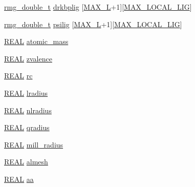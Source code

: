 \begin{DoxyCompactItemize}
\item 
\hyperlink{rmgtypes_8h_aaa16921c14f121c56eaa42390a340db8}{rmg\-\_\-double\-\_\-t} \hyperlink{struct_s_p_e_c_i_e_s_a5f5747982505f49983d15c0db1ab6c96}{drkbplig} \mbox{[}\hyperlink{_t_d_d_f_t_2_headers_2params_8h_adf2a0717e3307419a9d7c52707f5631e}{M\-A\-X\-\_\-\-L}+1\mbox{]}\mbox{[}\hyperlink{_t_d_d_f_t_2_headers_2params_8h_aa0d2d7cede5d9d8023a3dcb8861a3511}{M\-A\-X\-\_\-\-L\-O\-C\-A\-L\-\_\-\-L\-I\-G}\mbox{]}
\item 
\hyperlink{rmgtypes_8h_aaa16921c14f121c56eaa42390a340db8}{rmg\-\_\-double\-\_\-t} \hyperlink{struct_s_p_e_c_i_e_s_ae333127abacaf7428cb238baf6833563}{psilig} \mbox{[}\hyperlink{_t_d_d_f_t_2_headers_2params_8h_adf2a0717e3307419a9d7c52707f5631e}{M\-A\-X\-\_\-\-L}+1\mbox{]}\mbox{[}\hyperlink{_t_d_d_f_t_2_headers_2params_8h_aa0d2d7cede5d9d8023a3dcb8861a3511}{M\-A\-X\-\_\-\-L\-O\-C\-A\-L\-\_\-\-L\-I\-G}\mbox{]}
\item 
\hyperlink{md_8h_a4b654506f18b8bfd61ad2a29a7e38c25}{R\-E\-A\-L} \hyperlink{struct_s_p_e_c_i_e_s_a07aec77bc14fbe814244d1023992e517}{atomic\-\_\-mass}
\item 
\hyperlink{md_8h_a4b654506f18b8bfd61ad2a29a7e38c25}{R\-E\-A\-L} \hyperlink{struct_s_p_e_c_i_e_s_a2596f8ed233b9e49864f86ef944f107a}{zvalence}
\item 
\hyperlink{md_8h_a4b654506f18b8bfd61ad2a29a7e38c25}{R\-E\-A\-L} \hyperlink{struct_s_p_e_c_i_e_s_a9c42a064dc0dca3299b0f565d31a7354}{rc}
\item 
\hyperlink{md_8h_a4b654506f18b8bfd61ad2a29a7e38c25}{R\-E\-A\-L} \hyperlink{struct_s_p_e_c_i_e_s_a707adddcfc9358f43287628469ed9f18}{lradius}
\item 
\hyperlink{md_8h_a4b654506f18b8bfd61ad2a29a7e38c25}{R\-E\-A\-L} \hyperlink{struct_s_p_e_c_i_e_s_a805adc76eb310c6ee4aecbda32f32a70}{nlradius}
\item 
\hyperlink{md_8h_a4b654506f18b8bfd61ad2a29a7e38c25}{R\-E\-A\-L} \hyperlink{struct_s_p_e_c_i_e_s_a16b9d06292b3a0ffa77a95839718fa28}{qradius}
\item 
\hyperlink{md_8h_a4b654506f18b8bfd61ad2a29a7e38c25}{R\-E\-A\-L} \hyperlink{struct_s_p_e_c_i_e_s_a5884a36020f27b7eec7ec719116d1a9f}{mill\-\_\-radius}
\item 
\hyperlink{md_8h_a4b654506f18b8bfd61ad2a29a7e38c25}{R\-E\-A\-L} \hyperlink{struct_s_p_e_c_i_e_s_ae55d1487964fcb4e8c331d7de4f004de}{almesh}
\item 
\hyperlink{md_8h_a4b654506f18b8bfd61ad2a29a7e38c25}{R\-E\-A\-L} \hyperlink{struct_s_p_e_c_i_e_s_a0d25c69d878e8929812c37c1c64ff140}{aa}

\end{DoxyCompactItemize}
